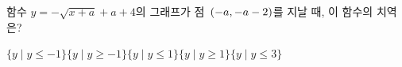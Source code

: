 함수 $y=-\sqrt{x+a}+a+4$의 그래프가 점~$(-a{,}\mkern3mu\mathopen{}-a-2)$를 지날 때, 이 함수의 치역은? 
\begin{choicesii}{$\{y \mid y\le -1\}$}{$\{y \mid y\ge -1\}$}{$\{y \mid y\le 1\}$}{$\{y \mid y\ge 1\}$}{$\{y \mid y\le 3\}$}\end{choicesii}
